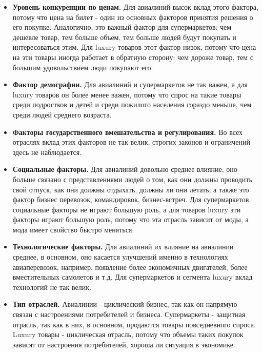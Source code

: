 \documentclass{article}
\begin{document}
\begin{itemize}
	\item \textbf{Уровень конкуренции по ценам.} Для авиалиний высок вклад этого фактора, потому что цена на билет - один из основных факторов принятия решения о его покупке. Аналогично, это важный фактор для супермаркетов: чем дешевле товар, тем больше объем, тем больше людей будут покупать и интересоваться этим. Для luxury товаров этот фактор низок, потому что цена на эти товары иногда работает в обратную сторону: чем дороже товар, тем с большим удовольствием люди покупают его.
	
	\item \textbf{Фактор демографии.} Для авиалиний и супермаркетов не так важен, а для luxury товаров он более менее важен, потому что спрос на такие товары среди подростков и детей и среди пожилого населения гораздо меньше, чем среди людей среднего возраста.
	
	\item \textbf{Факторы государственного вмешательства и регулирования.} Во всех отраслях вклад этих факторов не так велик, строгих законов и ограничений здесь не наблюдается.
	
	\item \textbf {Социальные факторы.} Для авиалиний довольно среднее влияние, оно больше связано с представлениями людей о том, как они должны проводить свой отпуск, как они должны отдыхать, должны ли они летать, а также это фактор бизнес перевозок, командировок, бизнес-встреч. Для супермаркетов социальные факторы не играют большую роль, а для товаров luxury эти факторы играют большую роль, потому что эта отрасль зависит от моды, а мода имеет свойство быстро меняться.
	
	\item \textbf{Технологические факторы.} Для авиалиний их влияние на авиалинии среднее, в основном, оно касается улучшений именно в технологиях авиаперевозок, например, появление более экономичных двигателей, более вместительных самолетов и т.д. Для супермаркетов и сегмента luxury вклад технологий не так велик.
	
	\item \textbf{Тип отраслей.} Авиалинии - циклический бизнес, так как он напрямую связан с настроениями потребителей и бизнеса. Супермаркеты - защитная отрасль, так как в них, в основном, продаются товары повседневного спроса. Luxury товары - циклическая отрасль, потому что объемы таких покупок зависят от настроения потребителей, хороша ли ситуация в экономике.
	
	\end{itemize}
	
\end{document}
